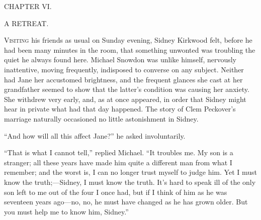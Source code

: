 {}

{CHAPTER VI.}

A RETREAT.

\textsc{Visiting} his friends as usual on Sunday evening, Sidney
Kirkwood felt, before he had been many minutes in the room, that
something unwonted was troubling the quiet he always found here. Michael
Snowdon was unlike himself, nervously inattentive, moving frequently,
indisposed to converse on any subject. Neither had Jane her accustomed
brightness, and the frequent glances she cast at her grandfather seemed
to show that the latter's condition was causing her anxiety. She
withdrew very early, and, as at once appeared, in order that Sidney
might hear in private what had that day happened. The story of Clem
Peckover's marriage naturally occasioned no little astonishment in
Sidney.

{}``And how will all this affect Jane?'' he asked involuntarily.

``That is what I cannot tell,'' replied Michael. ``It troubles me. My
son is a stranger; all these years have made him quite a different man
from what I remember; and the worst is, I can no longer trust myself to
judge him. Yet I must know the truth;---Sidney, I must know the truth.
It's hard to speak ill of the only son left to me out of the four I once
had, but if I think of him as he was seventeen years ago---no, no, he
must have changed as he has grown older. But you must help me to know
him, Sidney.''

